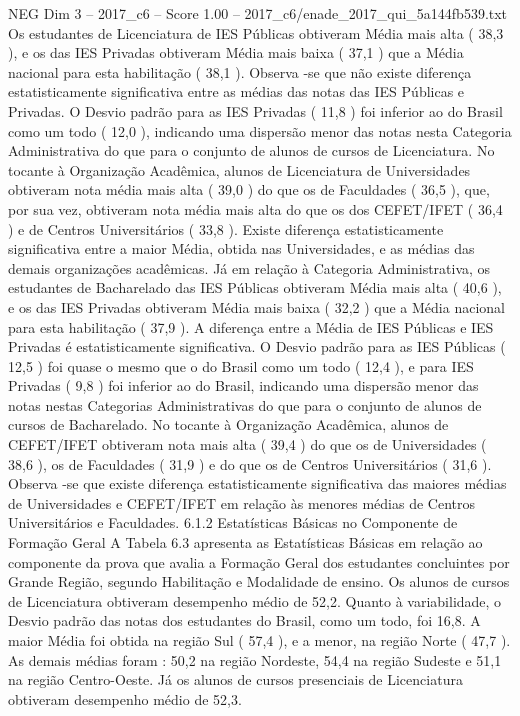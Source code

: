 \begin{textsample}{NEG Dim 3 – 2017\_c6 – Score 1.00 – 2017\_c6/enade\_2017\_qui\_5a144fb539.txt}
Os estudantes de Licenciatura de IES Públicas obtiveram Média mais alta ( 38,3 ), e os das IES Privadas obtiveram Média mais baixa ( 37,1 ) que a Média nacional para esta habilitação ( 38,1 ).
Observa -se que não existe diferença estatisticamente significativa entre as médias das notas das IES Públicas e Privadas.
O Desvio padrão para as IES Privadas ( 11,8 ) foi inferior ao do Brasil como um todo ( 12,0 ), indicando uma dispersão menor das notas nesta Categoria Administrativa do que para o conjunto de alunos de cursos de Licenciatura.
No tocante à Organização Acadêmica, alunos de Licenciatura de Universidades obtiveram nota média mais alta ( 39,0 ) do que os de Faculdades ( 36,5 ), que, por sua vez, obtiveram nota média mais alta do que os dos CEFET/IFET ( 36,4 ) e de Centros Universitários ( 33,8 ).
Existe diferença estatisticamente significativa entre a maior Média, obtida nas Universidades, e as médias das demais organizações acadêmicas.
Já em relação à Categoria Administrativa, os estudantes de Bacharelado das IES Públicas obtiveram Média mais alta ( 40,6 ), e os das IES Privadas obtiveram Média mais baixa ( 32,2 ) que a Média nacional para esta habilitação ( 37,9 ).
A diferença entre a Média de IES Públicas e IES Privadas é estatisticamente significativa.
O Desvio padrão para as IES Públicas ( 12,5 ) foi quase o mesmo que o do Brasil como um todo ( 12,4 ), e para IES Privadas ( 9,8 ) foi inferior ao do Brasil, indicando uma dispersão menor das notas nestas Categorias Administrativas do que para o conjunto de alunos de cursos de Bacharelado.
No tocante à Organização Acadêmica, alunos de CEFET/IFET obtiveram nota mais alta ( 39,4 ) do que os de Universidades ( 38,6 ), os de Faculdades ( 31,9 ) e do que os de Centros Universitários ( 31,6 ).
Observa -se que existe diferença estatisticamente significativa das maiores médias de Universidades e CEFET/IFET em relação às menores médias de Centros Universitários e Faculdades. 6.1.2 Estatísticas Básicas no Componente de Formação Geral A Tabela 6.3 apresenta as Estatísticas Básicas em relação ao componente da prova que avalia a Formação Geral dos estudantes concluintes por Grande Região, segundo Habilitação e Modalidade de ensino.
Os alunos de cursos de Licenciatura obtiveram desempenho médio de 52,2.
Quanto à variabilidade, o Desvio padrão das notas dos estudantes do Brasil, como um todo, foi 16,8.
A maior Média foi obtida na região Sul ( 57,4 ), e a menor, na região Norte ( 47,7 ).
As demais médias foram : 50,2 na região Nordeste, 54,4 na região Sudeste e 51,1 na região Centro-Oeste.
Já os alunos de cursos presenciais de Licenciatura obtiveram desempenho médio de 52,3.

\end{textsample}
